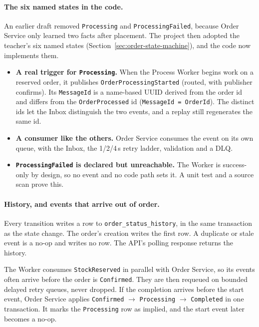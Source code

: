 \documentclass[a4paper]{report}
\begin{document}
\paragraph{The six named states in the code.} An earlier draft
removed \texttt{Processing} and \texttt{ProcessingFailed}, because Order
Service only learned two facts after placement. The project then adopted the
teacher's six named states (Section~\ref{sec:order-state-machine}), and the
code now implements them.
\begin{itemize}
  \item \textbf{A real trigger for \texttt{Processing}.} When the Process
    Worker begins work on a reserved order, it publishes
    \texttt{OrderProcessingStarted} (routed, with publisher confirms). Its
    \texttt{MessageId} is a name-based UUID derived from the order id and
    differs from the \texttt{OrderProcessed} id (\texttt{MessageId =
    OrderId}). The distinct ids let the Inbox distinguish the two events, and
    a replay still regenerates the same id.
  \item \textbf{A consumer like the others.} Order Service consumes the event
    on its own queue, with the Inbox, the 1/2/4\,s retry ladder, validation
    and a DLQ.
  \item \textbf{\texttt{ProcessingFailed} is declared but unreachable.} The
    Worker is success-only by design, so no event and no code path sets it.
    A unit test and a source scan prove this.
\end{itemize}

\paragraph{History, and events that arrive out of order.} Every transition
writes a row to \texttt{order\_status\_history}, in the same transaction as
the state change. The order's creation writes the first row. A duplicate or
stale event is a no-op and writes no row. The API's polling response returns
the history.

The Worker consumes \texttt{StockReserved} in parallel with Order Service, so
its events often arrive before the order is \texttt{Confirmed}. They are then
requeued on bounded delayed retry queues, never dropped. If the completion
arrives before the start event, Order Service applies \texttt{Confirmed}
$\to$ \texttt{Processing} $\to$ \texttt{Completed} in one transaction. It
marks the \texttt{Processing} row as implied, and the start event later
becomes a no-op.
\end{document}

